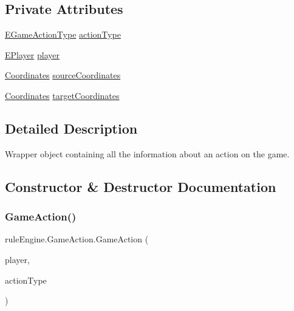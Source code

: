 \subsection*{Private Attributes}
\begin{DoxyCompactItemize}
\item 
\mbox{\hyperlink{enumrule_engine_1_1_e_game_action_type}{E\+Game\+Action\+Type}} \mbox{\hyperlink{classrule_engine_1_1_game_action_a385c48464866d2cd11bdf90323e52df8}{action\+Type}}
\item 
\mbox{\hyperlink{enumgame_1_1_e_player}{E\+Player}} \mbox{\hyperlink{classrule_engine_1_1_game_action_a966cfb64533d4cbe0ca5233ed642719d}{player}}
\item 
\mbox{\hyperlink{classrule_engine_1_1_coordinates}{Coordinates}} \mbox{\hyperlink{classrule_engine_1_1_game_action_a1a40c889fd4342784fe240fa9c2cea87}{source\+Coordinates}}
\item 
\mbox{\hyperlink{classrule_engine_1_1_coordinates}{Coordinates}} \mbox{\hyperlink{classrule_engine_1_1_game_action_ad75ba1f8ff9ecb3c40e5c082edeeef2e}{target\+Coordinates}}
\end{DoxyCompactItemize}


\subsection{Detailed Description}
Wrapper object containing all the information about an action on the game. 

\subsection{Constructor \& Destructor Documentation}
\mbox{\label{classrule_engine_1_1_game_action_ac1dd0eb1f6d319aa4ce0e59a1454355b}} 
\subsubsection{\texorpdfstring{Game\+Action()}{GameAction()}}
{\footnotesize\ttfamily rule\+Engine.\+Game\+Action.\+Game\+Action (\begin{DoxyParamCaption}\item[{\mbox{\hyperlink{enumgame_1_1_e_player}{E\+Player}}}]{player,  }\item[{\mbox{\hyperlink{enumrule_engine_1_1_e_game_action_type}{E\+Game\+Action\+Type}}}]{action\+Type }\end{DoxyParamCaption})\hspace{0.3cm}{\ttfamily [inline]}}



